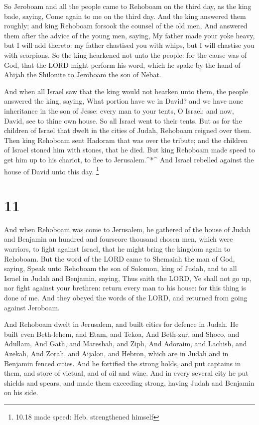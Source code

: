  So Jeroboam and all the people came to Rehoboam on the
third day, as the king bade, saying, Come again to me on the third day.
 And the king answered them roughly; and king Rehoboam
forsook the counsel of the old men,  And answered them
after the advice of the young men, saying, My father made your yoke
heavy, but I will add thereto: my father chastised you with whips, but I
will chastise you with scorpions.  So the king hearkened
not unto the people: for the cause was of God, that the LORD might
perform his word, which he spake by the hand of Ahijah the Shilonite to
Jeroboam the son of Nebat.

 And when all Israel saw that the king would not hearken
unto them, the people answered the king, saying, What portion have we in
David? and we have none inheritance in the son of Jesse: every man to
your tents, O Israel: and now, David, see to thine own house. So all
Israel went to their tents.  But as for the children of
Israel that dwelt in the cities of Judah, Rehoboam reigned over them.
 Then king Rehoboam sent Hadoram that was over the tribute;
and the children of Israel stoned him with stones, that he died. But
king Rehoboam made speed to get him up to his chariot, to flee to
Jerusalem.\^{}*\^{}  And Israel rebelled against the house
of David unto this day. \footnote{10.18 made speed: Heb. strengthened
  himself}

\hypertarget{section-10}{%
\section{11}\label{section-10}}

 And when Rehoboam was come to Jerusalem, he gathered of the
house of Judah and Benjamin an hundred and fourscore thousand chosen
men, which were warriors, to fight against Israel, that he might bring
the kingdom again to Rehoboam.  But the word of the LORD
came to Shemaiah the man of God, saying,  Speak unto
Rehoboam the son of Solomon, king of Judah, and to all Israel in Judah
and Benjamin, saying,  Thus saith the LORD, Ye shall not go
up, nor fight against your brethren: return every man to his house: for
this thing is done of me. And they obeyed the words of the LORD, and
returned from going against Jeroboam.

 And Rehoboam dwelt in Jerusalem, and built cities for
defence in Judah.  He built even Beth-lehem, and Etam, and
Tekoa,  And Beth-zur, and Shoco, and Adullam, 
And Gath, and Mareshah, and Ziph,  And Adoraim, and Lachish,
and Azekah,  And Zorah, and Aijalon, and Hebron, which are
in Judah and in Benjamin fenced cities.  And he fortified
the strong holds, and put captains in them, and store of victual, and of
oil and wine.  And in every several city he put shields and
spears, and made them exceeding strong, having Judah and Benjamin on his
side.

